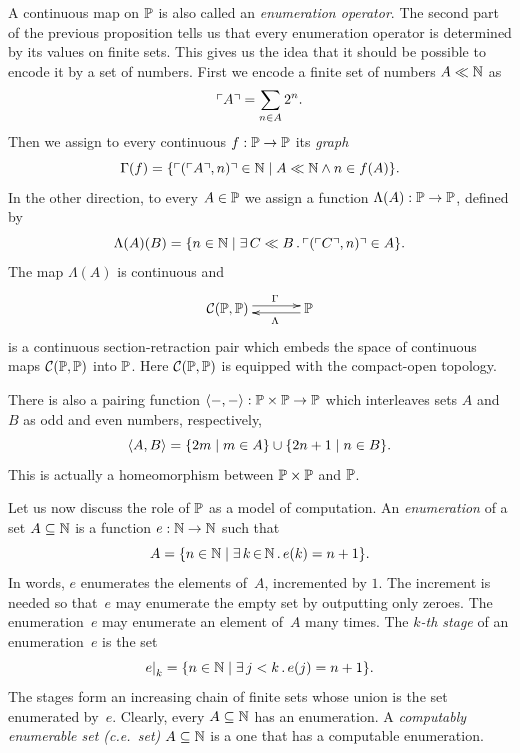A continuous map on $\mathbb{P}$ is also called an \emph{enumeration
  operator}. The second part of the previous proposition tells us that
every enumeration operator is determined by its values on finite sets.
This gives us the idea that it should be possible to encode it by a
set of numbers. First we encode a finite set of numbers $A \ll \mathbb{N}$
as
%
\begin{equation*}
  \ulcorner A \urcorner = \sum_{n \in A} 2^n.
\end{equation*}
%
Then we assign to every continuous $f : \mathbb{P} \to \mathbb{P}$ its
\emph{graph}
%
\begin{equation*}
  \Gamma(f) = \{\ulcorner (\ulcorner A \urcorner, n) \urcorner \in \mathbb{N} \mid
    A \ll \mathbb{N} \land n \in f(A)
  \}.
\end{equation*}
%
In the other direction, to every $A \in \mathbb{P}$ we assign a function
$\Lambda(A) : \mathbb{P} \to \mathbb{P}$, defined by
%
\begin{equation*}
  \Lambda(A)(B) = \{n \in \mathbb{N} \mid
    \exists\, C \ll B\,.\,\ulcorner (\ulcorner C \urcorner, n) \urcorner \in A
  \}.
\end{equation*}
%
The map $\Lambda(A)$ is continuous and
%
\begin{equation*}
  \xymatrix{
    **[l]{\mathcal{C}(\Scott, \Scott)}
    \ar@<+0.25em>[r]^{\Gamma}
    &
    {\Scott}
    \ar@<+0.25em>[l]^{\Lambda}
  }
\end{equation*}
%
is a continuous section-retraction pair which embeds the space of
continuous maps $\mathcal{C}(\mathbb{P}, \mathbb{P})$ into $\mathbb{P}$. Here
$\mathcal{C}(\mathbb{P}, \mathbb{P})$ is equipped with the compact-open
topology.

There is also a pairing function $\langle {-}, {-} \rangle : \mathbb{P} \times
\mathbb{P} \to \mathbb{P}$ which interleaves sets $A$ and $B$ as odd and even
numbers, respectively,
%
\begin{equation*}
  \langle A, B \rangle = \{2 m \mid m \in A\} \cup \{2 n + 1 \mid n \in B\}.
\end{equation*}
%
This is actually a homeomorphism between $\mathbb{P} \times \mathbb{P}$ and
$\mathbb{P}$.

Let us now discuss the role of $\mathbb{P}$ as a model of computation. An
\emph{enumeration} of a set $A \subseteq \mathbb{N}$ is a function $e : \mathbb{N}
\to \mathbb{N}$ such that
%
\begin{equation*}
  A = \{n \in \mathbb{N} \mid \exists\, k \,{\in}\, \mathbb{N}\,.\,e(k) = n + 1\}.
\end{equation*}
%
In words, $e$ enumerates the elements of~$A$, incremented by $1$. The
increment is needed so that~$e$ may enumerate the empty set by
outputting only zeroes. The enumeration~$e$ may enumerate an element
of~$A$ many times. The \emph{$k$-th stage} of an enumeration~$e$ is
the set
%
\begin{equation*}
  e{\mid}_{k} = \{n \in \mathbb{N} \mid \exists\, j < k\,.\,e(j) = n + 1\}.
\end{equation*}
%
The stages form an increasing chain of finite sets whose union is the
set enumerated by~$e$. Clearly, every $A \subseteq \mathbb{N}$ has an
enumeration. A \emph{computably enumerable set (c.e.\ set)} $A
\subseteq \mathbb{N}$ is a one that has a computable enumeration.

